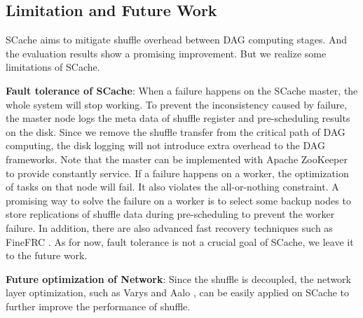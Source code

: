 \subsection{Limitation and Future Work}
SCache aims to mitigate shuffle overhead between DAG computing stages. And the evaluation results show a promising improvement. But we realize some limitations of SCache.

\textbf{Fault tolerance of SCache}: When a failure happens on the SCache master, the whole system will stop working. To prevent the inconsistency caused by failure, the master node logs the meta data of shuffle register and pre-scheduling results on the disk. Since we remove the shuffle transfer from the critical path of DAG computing, the disk logging will not introduce extra overhead to the DAG frameworks. Note that the master can be implemented with Apache ZooKeeper \cite{zookeeper} to provide constantly service. If a failure happens on a worker, the optimization of tasks on that node will fail. It also violates the all-or-nothing constraint. A promising way to solve the failure on a worker is to select some backup nodes to store replications of shuffle data during pre-scheduling to prevent the worker failure. In addition, there are also advanced fast recovery techniques such as FineFRC \cite{finefrc}. As for now, fault tolerance is not a crucial goal of SCache,  we leave it to the future work.


\textbf{Future optimization of Network}: Since the shuffle is decoupled, the network layer optimization, such as Varys \cite{varys} and Aalo \cite{aalo}, can be easily applied on SCache to further improve the performance of shuffle.